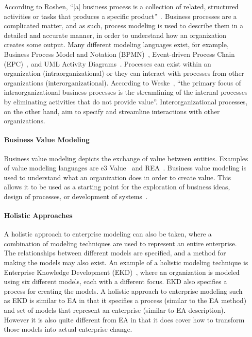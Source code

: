 According to Roshen, ``[a] business process is a collection of related, structured activities or tasks that produces a specific product''~\cite{roshen2009soa}. Business processes are a complicated matter, and as such, process modeling is used to describe them in a detailed and accurate manner, in order to understand how an organization creates some output. Many different modeling languages exist, for example, Business Process Model and Notation (BPMN)~\cite{model2011notation}, Event-driven Process Chain (EPC)~\cite[Ch. 6]{scheer2005process}, and UML Activity Diagrams~\cite{uml241}. Processes can exist within an organization (intraorganizational) or they can interact with processes from other organizations (interorganizational). According to Weske~\cite{weske2012business}, ``the primary focus of intraorganizational business processes is the streamlining of the internal processes by eliminating activities that do not provide value''. Interorganizational processes, on the other hand, aim to specify and streamline interactions with other organizations. 

\paragraph*{Business Value Modeling}

Business value modeling depicts the exchange of value between entities. Examples of value modeling languages are e3 Value~\cite{Gordijn2001e3value} and REA~\cite{pavel2006model}. Business value modeling is used to understand what an organization does in order to create value. This allows it to be used as a starting point for the exploration of business ideas, design of processes, or development of systems~\cite{johannesson2011lecture}.

\paragraph*{Holistic Approaches}

A holistic approach to enterprise modeling can also be taken, where a combination of modeling techniques are used to represent an entire enterprise. The relationships between different models are specified, and a method for making the models may also exist. An example of a holistic modeling technique is Enterprise Knowledge Development (EKD)~\cite{stirna2007ten,bubenko2001user}, where an organization is modeled using six different models, each with a different focus. EKD also specifies a process for creating the models. A holistic approach to enterprise modeling such as EKD is similar to EA in that it specifies a process (similar to the EA method) and set of models that represent an enterprise (similar to EA description). However it is also quite different from EA in that it does cover how to transform those models into actual enterprise change.

